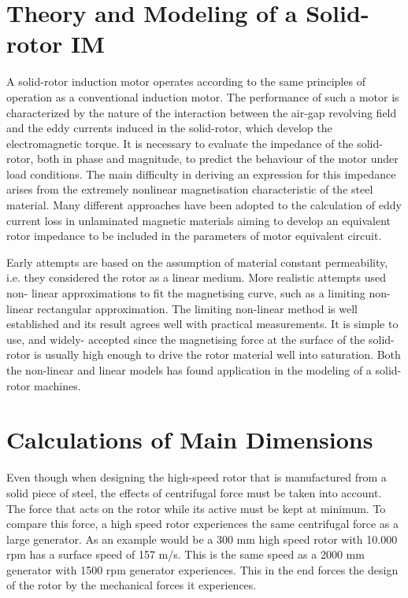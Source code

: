\section{Theory and Modeling of a Solid-rotor IM} %

A solid-rotor induction motor operates according to the same principles of
operation as a conventional induction motor. The performance of such a motor is
characterized by the nature of the interaction between the air-gap revolving field and
the eddy currents induced in the solid-rotor, which develop the electromagnetic
torque. It is necessary to evaluate the impedance of the solid- rotor, both in phase and
magnitude, to predict the behaviour of the motor under load conditions. The main
difficulty in deriving an expression for this impedance arises from the extremely
nonlinear magnetisation characteristic of the steel material. Many different
approaches have been adopted to the calculation of eddy current loss in unlaminated
magnetic materials aiming to develop an equivalent rotor impedance to be included
in the parameters of motor equivalent circuit.

Early attempts are based on the assumption of material constant permeability,
i.e. they considered the rotor as a linear medium. More realistic attempts used non-
linear approximations to fit the magnetising curve, such as a limiting non-linear
rectangular approximation. The limiting non-linear method is well established and its
result agrees well with practical measurements. It is simple to use, and widely-
accepted since the magnetising force at the surface of the solid-rotor is usually high
enough to drive the rotor material well into saturation. Both the non-linear and linear
models has found application in the modeling of a solid-rotor machines.

\section{Calculations of Main Dimensions} %

Even though when designing the high-speed rotor that is manufactured from a
solid piece of steel, the effects of centrifugal force must be taken into account. The
force that acts on the rotor while its active must be kept at minimum. To compare
this force, a high speed rotor experiences the same centrifugal force as a large
generator. As an example would be a 300 mm high speed rotor with 10.000 rpm has
a surface speed of 157 m/s. This is the same speed as a 2000 mm generator with
1500 rpm generator experiences. This in the end forces the design of the rotor by the
mechanical forces it experiences.

